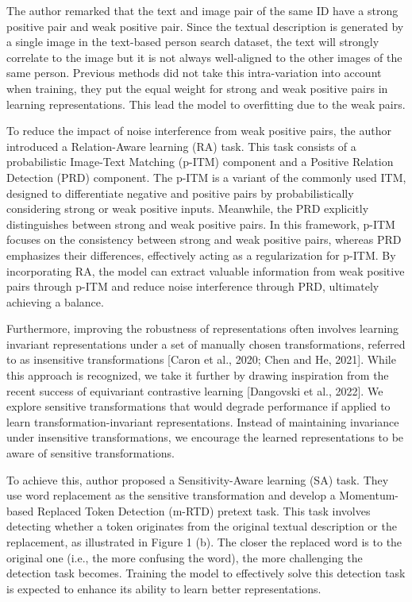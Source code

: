 The author remarked that the text and image pair of the same ID have a strong positive pair and weak positive pair. Since the textual description is generated by a single image in the text-based person search dataset, the text will strongly correlate to the image but it is not always well-aligned to the other images of the same person. Previous methods did not take this intra-variation into account when training, they put the equal weight for strong and weak positive pairs in learning representations. This lead the model to overfitting due to the weak pairs.

To reduce the impact of noise interference from weak positive pairs, the author introduced a Relation-Aware learning (RA) task. This task consists of a probabilistic Image-Text Matching (p-ITM) component and a Positive Relation Detection (PRD) component. The p-ITM is a variant of the commonly used ITM, designed to differentiate negative and positive pairs by probabilistically considering strong or weak positive inputs. Meanwhile, the PRD explicitly distinguishes between strong and weak positive pairs. In this framework, p-ITM focuses on the consistency between strong and weak positive pairs, whereas PRD emphasizes their differences, effectively acting as a regularization for p-ITM. By incorporating RA, the model can extract valuable information from weak positive pairs through p-ITM and reduce noise interference through PRD, ultimately achieving a balance.

Furthermore, improving the robustness of representations often involves learning invariant representations under a set of manually chosen transformations, referred to as insensitive transformations [Caron et al., 2020; Chen and He, 2021]. While this approach is recognized, we take it further by drawing inspiration from the recent success of equivariant contrastive learning [Dangovski et al., 2022]. We explore sensitive transformations that would degrade performance if applied to learn transformation-invariant representations. Instead of maintaining invariance under insensitive transformations, we encourage the learned representations to be aware of sensitive transformations. 

To achieve this, author proposed a Sensitivity-Aware learning (SA) task. They use word replacement as the sensitive transformation and develop a Momentum-based Replaced Token Detection (m-RTD) pretext task. This task involves detecting whether a token originates from the original textual description or the replacement, as illustrated in Figure 1 (b). The closer the replaced word is to the original one (i.e., the more confusing the word), the more challenging the detection task becomes. Training the model to effectively solve this detection task is expected to enhance its ability to learn better representations.

